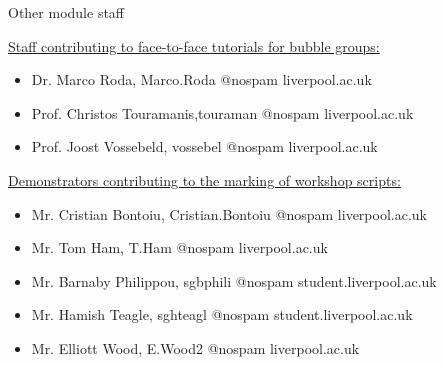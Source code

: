 \begin{frame}{Other module staff}

\underline{Staff contributing to face-to-face tutorials for bubble groups:}\\
\vspace{0.2cm}
\begin{itemize}
  \item Dr. Marco Roda, Marco.Roda @nospam liverpool.ac.uk
  \item Prof. Christos Touramanis,touraman @nospam liverpool.ac.uk
  \item Prof. Joost Vossebeld, vossebel @nospam liverpool.ac.uk
\end{itemize}

\vspace{0.4cm}

\underline{Demonstrators contributing to the marking of workshop scripts:}\\
\vspace{0.2cm}
\begin{itemize}
  \item Mr. Cristian Bontoiu, Cristian.Bontoiu @nospam liverpool.ac.uk
  \item Mr. Tom Ham, T.Ham @nospam liverpool.ac.uk
  \item Mr. Barnaby Philippou, sgbphili @nospam student.liverpool.ac.uk
  \item Mr. Hamish Teagle,  sghteagl @nospam student.liverpool.ac.uk
  \item Mr. Elliott Wood, E.Wood2 @nospam liverpool.ac.uk
\end{itemize}

\end{frame}

